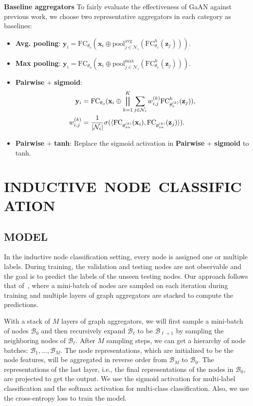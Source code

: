 \documentclass{article}
\DeclarePairedDelimiter\abs{\lvert}{\rvert}\DeclarePairedDelimiter\norm{\lVert}{\rVert}
\begin{document}
	\textbf{Baseline aggregators} \quad To fairly evaluate the effectiveness of GaAN against previous work, we choose two representative aggregators in each category as baselines:
	\begin{itemize}
\item \textbf{Avg. pooling}: $\mathbf{y}_i  = \text{FC}_{\theta_o}(\mathbf{x}_i \oplus \text{pool}^{\text{avg}}_{j \in \mathcal{N}_i}(\text{FC}^h_{\theta_{v}}(\mathbf{z}_j))).$
		\item \textbf{Max pooling}: $\mathbf{y}_i  = \text{FC}_{\theta_o}(\mathbf{x}_i \oplus \text{pool}^{\max}_{j \in \mathcal{N}_i}(\text{FC}^h_{\theta_{v}}(\mathbf{z}_j))).$
		\item \textbf{Pairwise} + \textbf{sigmoid}:
		\begin{equation}
		\nonumber
		\begin{aligned}
		\mathbf{y}_i  &= \text{FC}_{\theta_o}(\mathbf{x}_i \oplus \bigparallel_{k=1}^K \sum_{j\in \mathcal{N}_i} w_{i, j}^{(k)} \text{FC}^h_{\theta_{v}^{(k)}}(\mathbf{z}_j)),\\
		w_{i, j}^{(k)} &= \frac{1}{\abs{\mathcal{N}_i}} \sigma(\langle\text{FC}_{\theta_{xa}^{(k)}}(\mathbf{x}_i), \text{FC}_{\theta_{za}^{(k)}}(\mathbf{z}_j)\rangle).
		\end{aligned}
		\end{equation}
		\item \textbf{Pairwise} + \textbf{tanh}:  Replace the sigmoid activation in \textbf{Pairwise} + \textbf{sigmoid} to tanh.
	\end{itemize}
	
\section{INDUCTIVE~NODE~CLASSIFICATION}
	\subsection{MODEL}
	\label{sec:inductive_model}
	In the inductive node classification setting, every node is assigned one or multiple labels. During training, the validation and testing nodes are not observable and the goal is to predict the labels of the unseen testing nodes. Our approach follows that of~\citep{hamilton2017inductive}, where a mini-batch of nodes are sampled on each iteration during training and multiple layers of graph aggregators are stacked to compute the predictions.
	
	With a stack of $M$ layers of graph aggregators, we will first sample a mini-batch of nodes $\mathcal{B}_0$ and then recursively expand $\mathcal{B}_\ell$ to be $\mathcal{B}_{\ell+1}$ by sampling the neighboring nodes of $\mathcal{B}_\ell$. After $M$ sampling steps, we can get a hierarchy of node batches: $\mathcal{B}_1,..., \mathcal{B}_M$. The node representations, which are initialized to be the node features, will be aggregated in reverse order from $\mathcal{B}_M$ to $\mathcal{B}_0$. The representations of the last layer, i.e., the final representations of the nodes in ${\mathcal{B}_0}$, are projected to get the output. We use the sigmoid activation for multi-label classification and the softmax activation for multi-class classification. Also, we use the cross-entropy loss to train the model.
	
\end{document}
